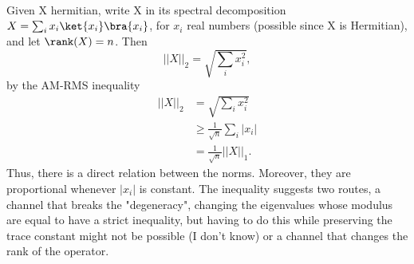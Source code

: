 \begin{solution}[Part (b)]
\\
Given X hermitian, write X in its spectral decomposition $X=\sum_i x_i \ket{x_i}\bra{x_i}$, for $x_i$ real numbers (possible since X is Hermitian), and let $\rank(X)=n$. Then 
$$||X||_2=\sqrt{\sum_i x_i^2},$$ by the AM-RMS inequality
\begin{equation}
    \begin{split}
        ||X||_2&=\sqrt{\sum_i x_i^2}\\
        &\geq \frac{1}{\sqrt{n}}\sum_i|x_i|\\
        &= \frac{1}{\sqrt{n}} ||X||_1.
    \end{split}
    \label{ineq norms}
\end{equation}
Thus, there is a direct relation between the norms. Moreover, they are proportional whenever $|x_i|$ is constant.
The inequality suggests two routes, a channel that breaks the "degeneracy", changing the eigenvalues whose modulus are equal to have a strict inequality, but having to do this while preserving the trace constant might not be possible (I don't know) or a channel that changes the rank of the operator.


\end{solution}
